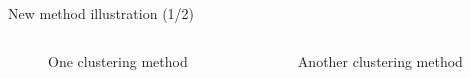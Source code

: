 \begin{frame}{New method illustration (1/2)}
    \begin{columns}
        \begin{column}{0.4\paperwidth}
            \begin{figure}
                \caption{One clustering method}
            \end{figure}
        \end{column}
        \begin{column}{0.4\paperwidth}
            \begin{figure}
                \caption{Another clustering method}
            \end{figure}
        \end{column}
    \end{columns}
\end{frame}

